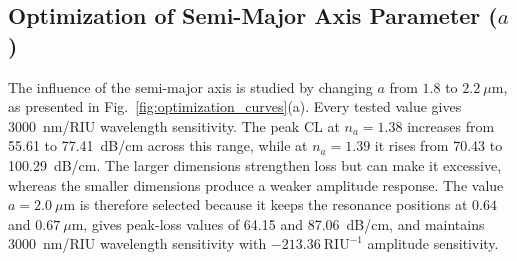 \documentclass[ACS,STIX2COL]{WileyNJD-v2}
\begin{document}
\subsection{Optimization of Semi-Major Axis Parameter ($a$)}
The influence of the semi-major axis is studied by changing $a$ from $1.8$ to $2.2~\mu\mathrm{m}$, as presented in Fig.~\ref{fig:optimization_curves}(a). Every tested value gives 3000~nm/RIU wavelength sensitivity. The peak CL at $n_a=1.38$ increases from 55.61 to 77.41~dB/cm across this range, while at $n_a=1.39$ it rises from 70.43 to 100.29~dB/cm. The larger dimensions strengthen loss but can make it excessive, whereas the smaller dimensions produce a weaker amplitude response. The value $a=2.0~\mu\mathrm{m}$ is therefore selected because it keeps the resonance positions at $0.64$ and $0.67~\mu\mathrm{m}$, gives peak-loss values of 64.15 and 87.06~dB/cm, and maintains 3000~nm/RIU wavelength sensitivity with $-213.36~\mathrm{RIU}^{-1}$ amplitude sensitivity.
\end{document}
